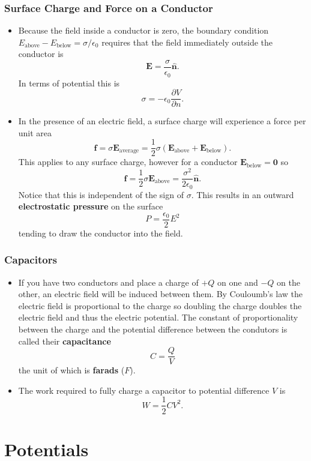 \documentclass{article}
\renewcommand{\vec}[1]{\boldsymbol{\mathbf{#1}}}
\newcommand{\uvec}[1]{\hat{\vec{#1}}}
\begin{document}
\subsubsection{Surface Charge and Force on a Conductor}

\begin{itemize}
  \item Because the field inside a conductor is zero, the boundary condition $E_\text{above} - E_\text{below} = \sigma / \epsilon_0$ requires that the field immediately outside the conductor is \[\vec{E} = \frac{\sigma}{\epsilon_0} \uvec{n}.\] In terms of potential this is \[\sigma = -\epsilon_0 \frac{\partial V}{\partial n}.\]

  \item In the presence of an electric field, a surface charge will experience a force per unit area \[\vec{f} = \sigma \vec{E}_\text{average} = \frac{1}{2} \sigma (\vec{E}_\text{above} + \vec{E}_\text{below}).\] This applies to any surface charge, however for a conductor $\vec{E}_\text{below} = \vec{0}$ so \[\vec{f} = \frac{1}{2} \sigma \vec{E}_\text{above} = \frac{\sigma^2}{2 \epsilon_0} \uvec{n}.\] Notice that this is independent of the sign of $\sigma$. This results in an outward \textbf{electrostatic pressure} on the surface \[P = \frac{\epsilon_0}{2} E^2\] tending to draw the conductor into the field.
\end{itemize}

\subsubsection{Capacitors}

\begin{itemize}
  \item If you have two conductors and place a charge of $+Q$ on one and $-Q$ on the other, an electric field will be induced between them. By Couloumb's law the electric field is proportional to the charge so doubling the charge doubles the electric field and thus the electric potential. The constant of proportionality between the charge and the potential difference between the condutors is called their \textbf{capacitance} \[C = \frac{Q}{V}\] the unit of which is \textbf{farads} ($\unit{F}$).

  \item The work required to fully charge a capacitor to potential difference $V$ is \[W = \frac{1}{2} C V^2.\]
\end{itemize}

\section{Potentials}
\end{document}

